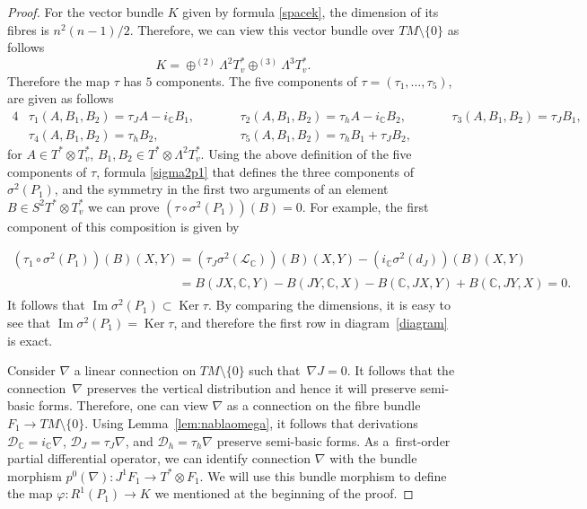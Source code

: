 \documentclass[11pt]{article}
\numberwithin{equation}{section}
\begin{document}
\begin{proof}
For the vector bundle $K$ given by formula \eqref{spacek}, the
dimension of its f\/ibres is $n^2(n-1)/2$. Therefore, we can view this
vector bundle over $TM\setminus\{0\}$ as follows
\[
K=\oplus^{(2)}\Lambda^2T^*_v \oplus^{(3)}\Lambda^3T^*_v.
\]
Therefore the map $\tau$ has $5$ components.
The f\/ive components of $\tau=(\tau_1,\dots , \tau_5)$, are given as
follows
\begin{alignat*}{4}
& \tau_{1}(A,B_1,B_2) = \tau_JA - i_{\mathbb{C}}B_1, \qquad &&
\tau_{2}(A,B_1,B_2) = \tau_hA - i_{\mathbb{C}}B_2, \qquad &&
\tau_{3}(A,B_1,B_2) = \tau_JB_1,&  \\
& \tau_{4}(A,B_1,B_2) = \tau_hB_2, \qquad &&
\tau_{5}(A,B_1,B_2) = \tau_hB_1+\tau_JB_2, &&&
\end{alignat*}
for $A\in T^*\otimes T^*_v$, $B_1, B_2 \in T^*\otimes
\Lambda^2T^*_v$. Using the above def\/inition of the f\/ive components of $\tau$,
formula \eqref{sigma2p1} that def\/ines the three components of
$\sigma^2(P_1)$, and the symmetry in the f\/irst two arguments of an
element $B\in S^2T^*\otimes T^*_v$ we can prove $\left(\tau\circ
\sigma^2(P_1)\right)(B)=0$. For example, the f\/irst component of this
composition is given by {\sloppy
\begin{gather*}
\left(\tau_1\circ \sigma^2(P_1)\right)(B)(X,Y)  =
\left(\tau_J\sigma^2({\mathcal{L}_{\mathbb{C}}})\right)(B)(X,Y)-
\left(i_{\mathbb{C}}\sigma^2(d_J)\right)(B)(X,Y)\\
 \phantom{\left(\tau_1\circ \sigma^2(P_1)\right)(B)(X,Y)}{}
 = B(JX, \mathbb{C}, Y)- B(JY, \mathbb{C}, X) - B(\mathbb{C}, JX, Y)+ B(\mathbb{C}, JY, X)=0.\!
\end{gather*} It follows that $\operatorname{Im} \sigma^2(P_1)
\subset \operatorname{Ker} \tau $. By comparing the dimensions, it
is easy to see that  \mbox{$\operatorname{Im} \sigma^2(P_1) =
\operatorname{Ker} \tau $}, and therefore the f\/irst row in diagram~\eqref{diagram} is exact.

}

Consider $\nabla$ a linear connection on $TM\setminus\{0\}$ such
that~$\nabla J=0$. It follows that the connection~$\nabla$ preserves
the vertical distribution and hence it will preserve semi-basic
forms. Therefore, one can view $\nabla$ as a connection on the
f\/ibre bundle $F_1\to TM\setminus\{0\}$.  Using Lemma~\ref{lem:nablaomega}, it follows that derivations
$\mathcal{D}_{\mathbb{C}}=i_{\mathbb{C}}\nabla$,
$\mathcal{D}_{J}=\tau_{J}\nabla$, and $\mathcal{D}_{h}=\tau_{h}\nabla$
preserve semi-basic forms. As a~f\/irst-order partial
dif\/ferential operator, we can identify connection $\nabla$ with
the bundle morphism $p^0(\nabla): J^1F_1 \to T^*\otimes F_1$.
We will use this bundle morphism to def\/ine the map $\varphi: R^1(P_1)
\to K$ we mentioned at the beginning of the proof.


\end{proof}
\end{document}
